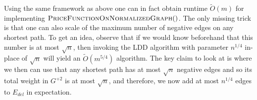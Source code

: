 Using the same framework as above one can in fact obtain runtime $\tilde{O}(m)$ for implementing  $\textsc{PriceFunctionOnNormalizedGraph}()$. The only missing trick is that one can also scale of the maximum number of negative edges on any shortest path. To get an idea, observe that if we would know beforehand that this number is at most $\sqrt{n}$, then invoking the LDD algorithm with parameter $n^{1/4}$ in-place of $\sqrt{n}$ will yield an $\tilde{O}(m^{5/4})$ algorithm. The key claim to look at is  where we then can use that any shortest path has at most $\sqrt{n}$ negative edges and so its total weight in $G^{+2}$ is at most $\sqrt{n}$, and therefore, we now add at most $n^{1/4}$ edges to $E_{del}$ in expectation. 